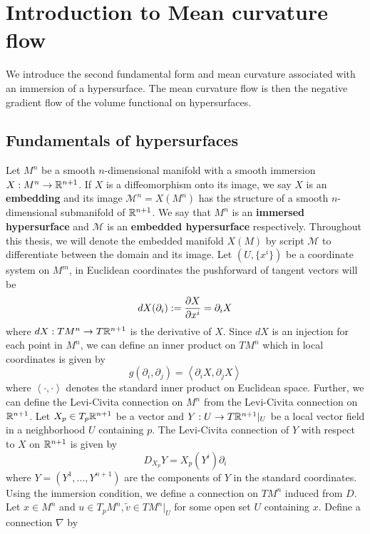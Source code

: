 \chapter{Introduction to Mean curvature flow}

We introduce the second fundamental form and mean curvature associated with an immersion of a hypersurface. The mean curvature flow is then the negative gradient flow of the volume functional on hypersurfaces. 
\section{Fundamentals of hypersurfaces}

Let $M^{n}$ be a smooth $ n $-dimensional manifold with a smooth immersion $ X : M^{n} \to \mathbb{R}^{n+1} $. If $ X $ is a diffeomorphism onto its image, we say $ X $ is an \textbf{embedding}  and its image $ \mathcal{M}^{n} = X(M^{n}) $ has the structure of a smooth $ n $-dimensional submanifold of $ \mathbb{R}^{n+1} $. We say that $ M^{n} $ is an \textbf{immersed hypersurface} and $ \mathcal{M} $ is an \textbf{embedded hypersurface} respectively. Throughout this thesis, we will denote the embedded manifold $ X(M) $ by script $ \mathcal{M} $ to differentiate between the domain and its image. Let $ (U, \{x^{i}\}) $ be a coordinate system on $ M^{m} $, in Euclidean coordinates the pushforward of tangent vectors will be 
    \[ dX( \partial_{i}) := \frac{ \partial X}{ \partial x^{i}} = \partial_{i}X \]
where $ dX : TM^{n} \to T\mathbb{R}^{n+1} $ is the derivative of $ X $. Since $ dX $ is an injection for each point in $ M^{n} $, we can define an inner product on $ TM^{n} $ which in local coordinates is given by 
    \[ g( \partial_{i}, \partial_{j}) = \left< \partial_{i}X, \partial_{j}X \right> \]
where $ \left< \cdot, \cdot \right> $ denotes the standard inner product on Euclidean space. Further, we can define the Levi-Civita connection on $ M^{n} $ from the Levi-Civita connection on $ \mathbb{R}^{n+1} $. Let $ X_{p} \in T_{p}\mathbb{R}^{n+1} $ be a vector and $ Y: U \to T\mathbb{R}^{n+1}|_{U} $ be a local vector field in a neighborhood $ U $ containing $ p $. The Levi-Civita connection of $ Y $ with respect to $ X $ on  $ \mathbb{R}^{n+1} $ is given by 
\[ D_{X_{p}}Y =  X_{p}(Y^{i}) \partial_{i}\]
where $ Y = (Y^{1}, \ldots , Y^{n+1}) $ are the components of $ Y $ in the standard coordinates. Using the immersion condition, we define a connection on $ TM^{n} $ induced from $ D $.  Let $ x \in M^{n} $ and $ u \in T_{p}M^{n}, \tilde{v} \in TM^{n}|_{U}$ for some open set $ U $ containing $ x $. Define a connection $ \nabla $ by 
